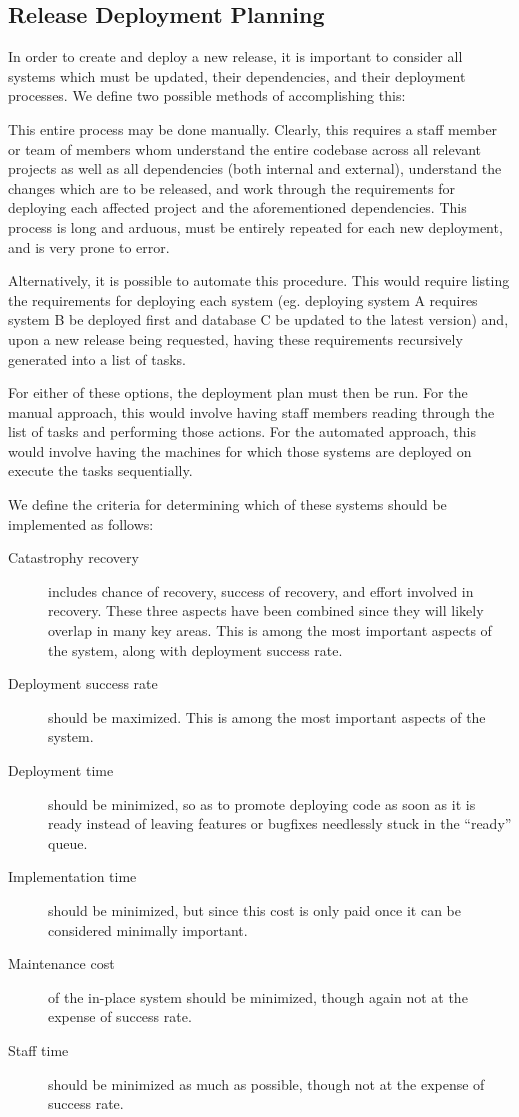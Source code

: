 \documentclass[12pt]{article}
\begin{document}
\subsection{Release Deployment Planning}
In order to create and deploy a new release, it is important to consider all systems which must be updated, their dependencies, and their deployment processes. We define two possible methods of accomplishing this:

This entire process may be done manually. Clearly, this requires a staff member or team of members whom understand the entire codebase across all relevant projects as well as all dependencies (both internal and external), understand the changes which are to be released, and work through the requirements for deploying each affected project and the aforementioned dependencies. This process is long and arduous, must be entirely repeated for each new deployment, and is very prone to error.

Alternatively, it is possible to automate this procedure. This would require listing the requirements for deploying each system (eg. deploying system A requires system B be deployed first and database C be updated to the latest version) and, upon a new release being requested, having these requirements recursively generated into a list of tasks.

For either of these options, the deployment plan must then be run. For the manual approach, this would involve having staff members reading through the list of tasks and performing those actions. For the automated approach, this would involve having the machines for which those systems are deployed on execute the tasks sequentially.

We define the criteria for determining which of these systems should be implemented as follows:
\begin{description}
\item[Catastrophy recovery] includes chance of recovery, success of recovery, and effort involved in recovery. These three aspects have been combined since they will likely overlap in many key areas. This is among the most important aspects of the system, along with deployment success rate.
\item[Deployment success rate] should be maximized. This is among the most important aspects of the system.
\item[Deployment time] should be minimized, so as to promote deploying code as soon as it is ready instead of leaving features or bugfixes needlessly stuck in the ``ready'' queue.
\item[Implementation time] should be minimized, but since this cost is only paid once it can be considered minimally important.
\item[Maintenance cost] of the in-place system should be minimized, though again not at the expense of success rate.
\item[Staff time] should be minimized as much as possible, though not at the expense of success rate.
\end{description}
\end{document}
